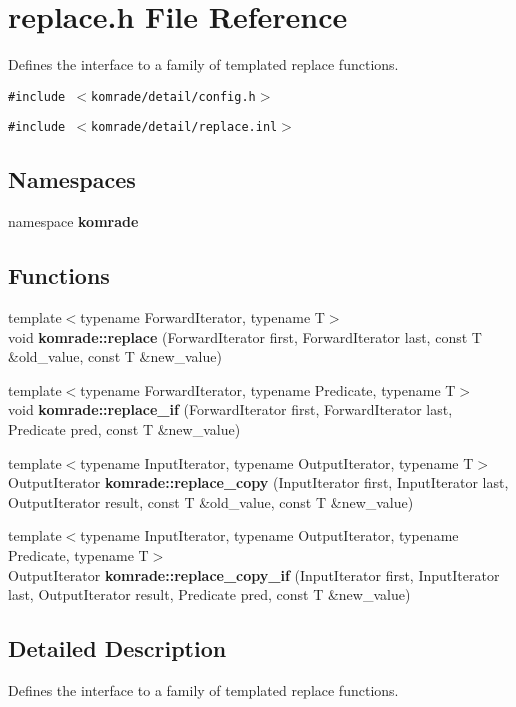 \section{replace.h File Reference}
\label{replace_8h}
Defines the interface to a family of templated replace functions. 

{\tt \#include $<$komrade/detail/config.h$>$}\par
{\tt \#include $<$komrade/detail/replace.inl$>$}\par
\subsection*{Namespaces}
\begin{CompactItemize}
\item 
namespace {\bf komrade}
\end{CompactItemize}
\subsection*{Functions}
\begin{CompactItemize}
\item 
{\footnotesize template$<$typename ForwardIterator, typename T$>$ }\\void {\bf komrade::replace} (ForwardIterator first, ForwardIterator last, const T \&old\_\-value, const T \&new\_\-value)
\item 
{\footnotesize template$<$typename ForwardIterator, typename Predicate, typename T$>$ }\\void {\bf komrade::replace\_\-if} (ForwardIterator first, ForwardIterator last, Predicate pred, const T \&new\_\-value)
\item 
{\footnotesize template$<$typename InputIterator, typename OutputIterator, typename T$>$ }\\OutputIterator {\bf komrade::replace\_\-copy} (InputIterator first, InputIterator last, OutputIterator result, const T \&old\_\-value, const T \&new\_\-value)
\item 
{\footnotesize template$<$typename InputIterator, typename OutputIterator, typename Predicate, typename T$>$ }\\OutputIterator {\bf komrade::replace\_\-copy\_\-if} (InputIterator first, InputIterator last, OutputIterator result, Predicate pred, const T \&new\_\-value)
\end{CompactItemize}


\subsection{Detailed Description}
Defines the interface to a family of templated replace functions. 

